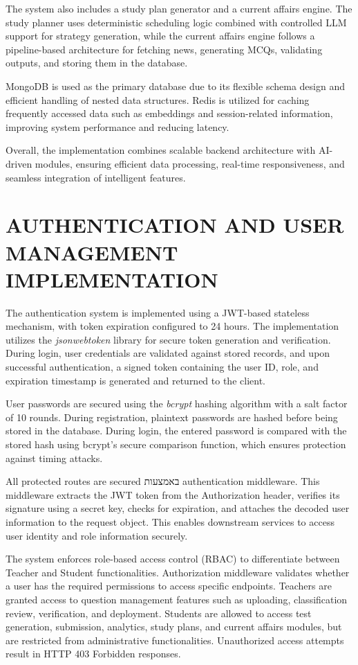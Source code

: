 \begin{sloppypar}
The system also includes a study plan generator and a current affairs engine. The study planner uses deterministic scheduling logic combined with controlled LLM support for strategy generation, while the current affairs engine follows a pipeline-based architecture for fetching news, generating MCQs, validating outputs, and storing them in the database.

MongoDB is used as the primary database due to its flexible schema design and efficient handling of nested data structures. Redis is utilized for caching frequently accessed data such as embeddings and session-related information, improving system performance and reducing latency.

Overall, the implementation combines scalable backend architecture with AI-driven modules, ensuring efficient data processing, real-time responsiveness, and seamless integration of intelligent features.

\section{\MakeUppercase{AUTHENTICATION AND USER MANAGEMENT IMPLEMENTATION}}

The authentication system is implemented using a JWT-based stateless mechanism, with token expiration configured to 24 hours. The implementation utilizes the \textit{jsonwebtoken} library for secure token generation and verification. During login, user credentials are validated against stored records, and upon successful authentication, a signed token containing the user ID, role, and expiration timestamp is generated and returned to the client.

User passwords are secured using the \textit{bcrypt} hashing algorithm with a salt factor of 10 rounds. During registration, plaintext passwords are hashed before being stored in the database. During login, the entered password is compared with the stored hash using bcrypt's secure comparison function, which ensures protection against timing attacks.

All protected routes are secured באמצעות authentication middleware. This middleware extracts the JWT token from the Authorization header, verifies its signature using a secret key, checks for expiration, and attaches the decoded user information to the request object. This enables downstream services to access user identity and role information securely.

The system enforces role-based access control (RBAC) to differentiate between Teacher and Student functionalities. Authorization middleware validates whether a user has the required permissions to access specific endpoints. Teachers are granted access to question management features such as uploading, classification review, verification, and deployment. Students are allowed to access test generation, submission, analytics, study plans, and current affairs modules, but are restricted from administrative functionalities. Unauthorized access attempts result in HTTP 403 Forbidden responses.


\end{sloppypar}
